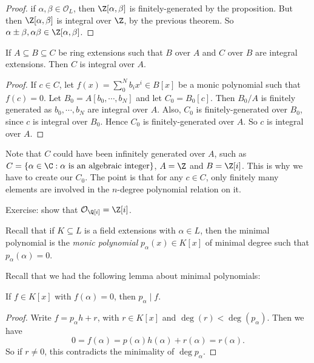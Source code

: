 \documentclass[a4paper]{article}
\begin{document}
\begin{proof}
  if $\alpha, \beta \in \mathcal{O}_L$, then $\Z[\alpha, \beta]$ is finitely-generated by the proposition. But then $\Z[\alpha, \beta]$ is integral over $\Z$, by the previous theorem. So $\alpha \pm \beta, \alpha\beta \in \Z[\alpha, \beta]$.
\end{proof}

\begin{cor}
  If $A \subseteq B \subseteq C$ be ring extensions such that $B$ over $A$ and $C$ over $B$ are integral extensions. Then $C$ is integral over $A$.
\end{cor}

\begin{proof}
  If $c \in C$, let $f(x) = \sum_{0}^N b_i x^i \in B[x]$ be a monic polynomial such that $f(c) = 0$. Let $B_0 = A[b_0, \cdots, b_N]$ and let $C_0 = B_0[c]$. Then $B_0/A$ is finitely generated as $b_0, \cdots, b_N$ are integral over $A$. Also, $C_0$ is finitely-generated over $B_0$, since $c$ is integral over $B_0$. Hence $C_0$ is finitely-generated over $A$. So $c$ is integral over $A$.
\end{proof}

Note that $C$ could have been infinitely generated over $A$, such as $C = \{\alpha \in \C: \alpha\text{ is an algebraic integer}\}$, $A = \Z$ and $B = \Z[i]$. This is why we have to create our $C_0$. The point is that for any $c \in C$, only finitely many elements are involved in the $n$-degree polynomial relation on it.

Exercise: show that $\mathcal{O}_{\Q[i]} = \Z[i]$.

Recall that if $K \subseteq L$ is a field extensions with $\alpha \in L$, then the minimal polynomial is the \emph{monic polynomial} $p_\alpha(x) \in K[x]$ of minimal degree such that $p_\alpha(\alpha) = 0$.

Recall that we had the following lemma about minimal polynomials:
\begin{lemma}
  If $f \in K[x]$ with $f(\alpha) = 0$, then $p_\alpha \mid f$.
\end{lemma}

\begin{proof}
  Write $f = p_\alpha h + r$, with $r \in K[x]$ and $\deg(r) < \deg (p_\alpha)$. Then we have
  \[
    0 = f(\alpha) = p(\alpha) h(\alpha) + r(\alpha) = r(\alpha).
  \]
  So if $r \not= 0$, this contradicts the minimality of $\deg p_\alpha$.
\end{proof}
\end{document}
